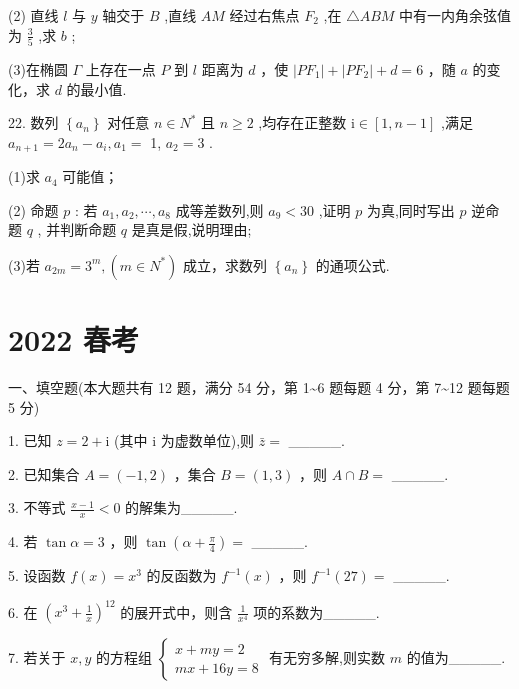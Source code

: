 \documentclass[10pt]{article}
\begin{document}
(2) 直线 \(l\) 与 \(y\) 轴交于 \(B\) ,直线 \({AM}\) 经过右焦点 \({F}_{2}\) ,在 \(\bigtriangleup {ABM}\) 中有一内角余弦值为 \(\frac{3}{5}\) ,求 \(b\) ;

(3)在椭圆 \(\Gamma\) 上存在一点 \(P\) 到 \(l\) 距离为 \(d\) ，使 \(\left| {P{F}_{1}}\right|  + \left| {P{F}_{2}}\right|  + d = 6\) ，随 \(a\) 的变化，求 \(d\) 的最小值.

22. 数列 \(\left\{  {a}_{n}\right\}\) 对任意 \(n \in  {N}^{ * }\) 且 \(n \geq  2\) ,均存在正整数 \(\mathrm{i} \in  \left\lbrack  {1,n - 1}\right\rbrack\) ,满足 \({a}_{n + 1} = 2{a}_{n} - {a}_{i},{a}_{1} =\) 1, \({a}_{2} = 3\) .

(1)求 \({a}_{4}\) 可能值；

(2) 命题 \(p\) : 若 \({a}_{1},{a}_{2},\cdots ,{a}_{8}\) 成等差数列,则 \({a}_{9} < {30}\) ,证明 \(p\) 为真,同时写出 \(p\) 逆命题 \(q\) , 并判断命题 \(q\) 是真是假,说明理由;

(3)若 \({a}_{2m} = {3}^{m},\left( {m \in  {N}^{ * }}\right)\) 成立，求数列 \(\left\{  {a}_{n}\right\}\) 的通项公式.

\section*{2022 春考}

一、填空题(本大题共有 12 题，满分 54 分，第 1\textasciitilde 6 题每题 4 分，第 7\textasciitilde 12 题每题 5 分)

1. 已知 \(z = 2 + \mathrm{i}\) (其中 \(\mathrm{i}\) 为虚数单位),则 \(\bar{z} =\) \_\_\_\_\_.

2. 已知集合 \(A = \left( {-1,2}\right)\) ，集合 \(B = \left( {1,3}\right)\) ，则 \(A \cap  B =\) \_\_\_\_\_.

3. 不等式 \(\frac{x - 1}{x} < 0\) 的解集为\_\_\_\_\_.

4. 若 \(\tan \alpha  = 3\) ，则 \(\tan \left( {\alpha  + \frac{\pi }{4}}\right)  =\) \_\_\_\_\_.

5. 设函数 \(f\left( x\right)  = {x}^{3}\) 的反函数为 \({f}^{-1}\left( x\right)\) ，则 \({f}^{-1}\left( {27}\right)  =\) \_\_\_\_\_.

6. 在 \({\left( {x}^{3} + \frac{1}{x}\right) }^{12}\) 的展开式中，则含 \(\frac{1}{{x}^{4}}\) 项的系数为\_\_\_\_\_.

7. 若关于 \(x,y\) 的方程组 \(\left\{  \begin{array}{l} x + {my} = 2 \\  {mx} + {16y} = 8 \end{array}\right.\) 有无穷多解,则实数 \(m\) 的值为\_\_\_\_\_.
\end{document}
